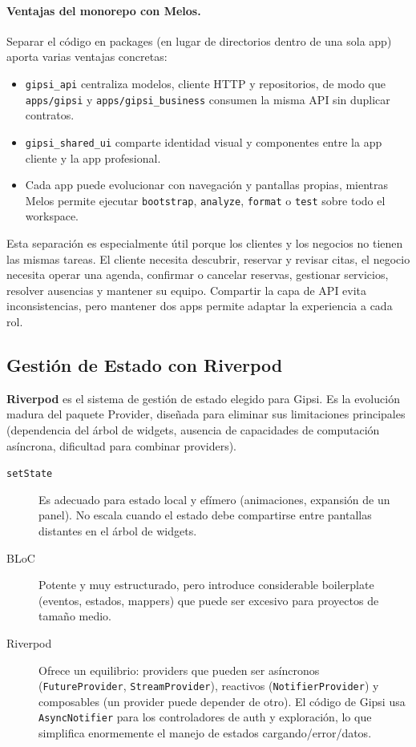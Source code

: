 \documentclass[12pt,a4paper,twoside]{report}
\begin{document}
\paragraph{Ventajas del monorepo con Melos.} Separar el código en packages (en lugar de directorios dentro de una sola app) aporta varias ventajas concretas:

\begin{itemize}
  \item \texttt{gipsi\_api} centraliza modelos, cliente HTTP y repositorios, de modo que \texttt{apps/gipsi} y \texttt{apps/gipsi\_business} consumen la misma API sin duplicar contratos.
  \item \texttt{gipsi\_shared\_ui} comparte identidad visual y componentes entre la app cliente y la app profesional.
  \item Cada app puede evolucionar con navegación y pantallas propias, mientras Melos permite ejecutar \texttt{bootstrap}, \texttt{analyze}, \texttt{format} o \texttt{test} sobre todo el workspace.
\end{itemize}

Esta separación es especialmente útil porque los clientes y los negocios no tienen las mismas tareas. El cliente necesita descubrir, reservar y revisar citas, el negocio necesita operar una agenda, confirmar o cancelar reservas, gestionar servicios, resolver ausencias y mantener su equipo. Compartir la capa de API evita inconsistencias, pero mantener dos apps permite adaptar la experiencia a cada rol.

\subsection{Gestión de Estado con Riverpod}

\textbf{Riverpod} es el sistema de gestión de estado elegido para Gipsi. Es la evolución madura del paquete Provider, diseñada para eliminar sus limitaciones principales (dependencia del árbol de widgets, ausencia de capacidades de computación asíncrona, dificultad para combinar providers).

\begin{tcolorbox}[definicionStyle, title={¿Por qué Riverpod y no BLoC o setState?}]
\begin{description}
  \item[\texttt{setState}] Es adecuado para estado local y efímero (animaciones, expansión de un panel). No escala cuando el estado debe compartirse entre pantallas distantes en el árbol de widgets.
  \item[BLoC] Potente y muy estructurado, pero introduce considerable boilerplate (eventos, estados, mappers) que puede ser excesivo para proyectos de tamaño medio.
  \item[Riverpod] Ofrece un equilibrio: providers que pueden ser asíncronos (\texttt{FutureProvider}, \texttt{StreamProvider}), reactivos (\texttt{NotifierProvider}) y composables (un provider puede depender de otro). El código de Gipsi usa \texttt{AsyncNotifier} para los controladores de auth y exploración, lo que simplifica enormemente el manejo de estados cargando/error/datos.
\end{description}
\end{tcolorbox}
\end{document}
